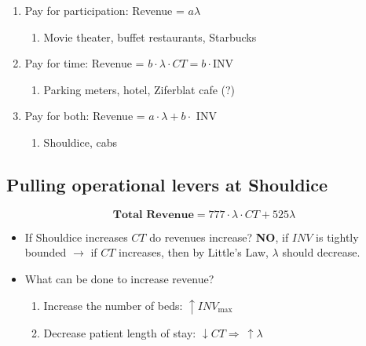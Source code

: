\documentclass[
  paper=a4,
,captions=tableheading
]{scrartcl}
\providecommand{\tightlist}{%
  \setlength{\itemsep}{0pt}\setlength{\parskip}{0pt}}
\begin{document}
\begin{enumerate}
\def\labelenumi{\arabic{enumi}.}
\tightlist
\item
  Pay for participation: Revenue = \(a \lambda\)

  \begin{enumerate}
  \def\labelenumii{\arabic{enumii}.}
  \tightlist
  \item
    Movie theater, buffet restaurants, Starbucks
  \end{enumerate}
\item
  Pay for time: Revenue =
  \(b \cdot \lambda \cdot CT = b \cdot\text{INV}\)

  \begin{enumerate}
  \def\labelenumii{\arabic{enumii}.}
  \tightlist
  \item
    Parking meters, hotel, Ziferblat cafe (?)
  \end{enumerate}
\item
  Pay for both: Revenue = \(a \cdot \lambda + b \cdot\text{ INV}\)

  \begin{enumerate}
  \def\labelenumii{\arabic{enumii}.}
  \tightlist
  \item
    Shouldice, cabs
  \end{enumerate}
\end{enumerate}

\hypertarget{pulling-operational-levers-at-shouldice}{%
\subsection{Pulling operational levers at
Shouldice}\label{pulling-operational-levers-at-shouldice}}

\[
\textbf{Total Revenue} = 777 \cdot {\lambda} \cdot CT  + 525 \lambda
\]

\begin{itemize}
\item
  If Shouldice increases \(CT\) do revenues increase? \textbf{NO}, if
  \(INV\) is tightly bounded \(\to\) if \(CT\) increases, then by
  Little's Law, \(\lambda\) should decrease.
\item
  What can be done to increase revenue?

  \begin{enumerate}
  \def\labelenumi{\arabic{enumi}.}
  \tightlist
  \item
    Increase the number of beds: \(\uparrow INV_\text{max}\)
  \item
    Decrease patient length of stay:
    \(\downarrow CT \Rightarrow \ \uparrow{\lambda}\)
  \end{enumerate}
\end{itemize}
\end{document}
